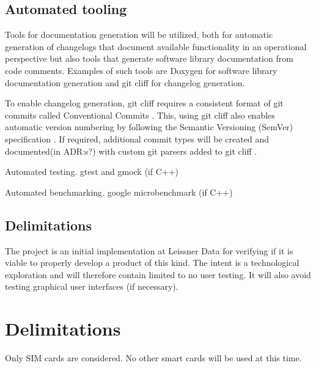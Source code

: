\subsection{Automated tooling}

Tools for documentation generation will be utilized, both for
automatic generation of changelogs that document available
functionality in an operational perspective but also tools that
generate software library documentation from code comments.
Examples of such tools are Doxygen \cite{doxygen} for software
library documentation generation and git cliff \cite{git-cliff} for
changelog generation.

To enable changelog generation, git cliff requires a consistent
format of git commits \cite{git-cliff} called Conventional Commits
\cite{conventional-commits}. This, using git cliff also enables
automatic version numbering \cite{git-cliff-bump-version} by
following the Semantic Versioning (SemVer) specification
\cite{semver}. If required, additional commit types will be created
and documented(in ADR:s?) with custom git parsers added to git
cliff \cite{git-cliff-tips-and-tricks}.

Automated testing.
gtest and gmock (if C++)

Automated benchmarking.
google microbenchmark (if C++)

\subsection{Delimitations}

The project is an initial implementation at Leissner Data for
verifying if it is viable to properly develop a product of this
kind. The intent is a technological exploration and will
therefore contain limited to no user testing. It will also avoid
testing graphical user interfaces (if necessary).

\section{Delimitations}

Only SIM cards are considered. No other smart cards will be used
at this time.
